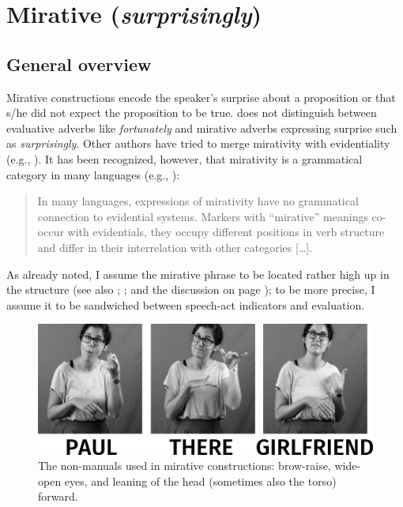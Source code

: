 \section{Mirative (\textit{surprisingly})}


\subsection{General overview}

Mirative constructions encode the speaker's surprise about a proposition or that s/he did not expect the proposition to be true. \citet[85]{cinque1999adverbs} does not distinguish between evaluative adverbs like \textit{fortunately} and mirative adverbs expressing surprise such as \textit{surprisingly}. Other authors have tried to merge mirativity with evidentiality (e.g., \citealt{guentcheva1996tro}). It has been recognized, however, that mirativity is a grammatical category in many languages (e.g., \citealt{delancey2001mirative, aikhenval2009evidentiality}):

\begin{quote}
In many languages, expressions of mirativity have no grammatical connection to evidential systems. Markers with ``mirative'' meanings co-occur with evidentials, they occupy different positions in verb structure and differ in their interrelation with other categories [\dots ]. \citep[436]{aikhenvald2012essence}
\end{quote}

\noindent As already noted, I assume the mirative phrase to be located rather high up in the structure (see also \citealt[317]{testcari2013}; \citealt[57--59]{varley2014evidentiality}; \citealt{alcazar2016minor} and the discussion on page \pageref{mirmir}); to be more precise, I assume it to be sandwiched between speech-act indicators and evaluation.

\begin{figure}[bt]
\centering
	\includegraphics[width=1.0\textwidth]{mirative-nnmtwosw.jpg}
	\caption{The non-manuals used in mirative constructions: brow-raise, wide-open eyes, and leaning of the head (sometimes also the torso) forward.}
	\label{fig:mirative}
\end{figure}

